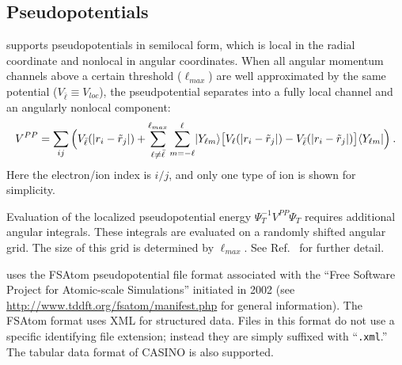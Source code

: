 \subsection{Pseudopotentials}
\label{sec:nlpp}
\qmcpack supports pseudopotentials in semilocal form, which is local in the radial coordinate and nonlocal in angular coordinates.  When all angular momentum channels above a certain threshold ($\ell_{max}$) are well approximated by the same potential ($V_{\bar{\ell}}\equiv V_{loc}$), the pseudpotential separates into a fully local channel and an angularly nonlocal component:
\begin{align}
  V^{PP} = \sum_{ij}\Big(V_{\bar{\ell}}(\lvert r_i-\tilde{r}_j \rvert) + \sum_{\ell\ne\bar{\ell}}^{\ell_{max}}\sum_{m=-\ell}^\ell \lvert Y_{\ell m} \rangle \big[V_\ell(\lvert r_i-\tilde{r}_j \rvert) - V_{\bar{\ell}}(\lvert r_i-\tilde{r}_j \rvert) \big] \langle Y_{\ell m} \rvert \Big)\:.
\end{align}  
Here the electron/ion index is $i/j$, and only one type of ion is shown for simplicity.

Evaluation of the localized pseudopotential energy $\Psi_T^{-1}V^{PP}\Psi_T$ requires additional angular integrals.  These integrals are evaluated on a randomly shifted angular grid.  The size of this grid is determined by $\ell_{max}$.  See Ref.~\cite{Mitas1991} for further detail. 

\qmcpack uses the FSAtom pseudopotential file format associated with the ``Free Software Project for Atomic-scale Simulations'' initiated in 2002  (see \url{http://www.tddft.org/fsatom/manifest.php} for general information).  The FSAtom format uses XML for structured data.  Files in this format do not use a specific identifying file extension; instead they are simply suffixed with ``\texttt{.xml}.''  The tabular data format of CASINO is also supported.





